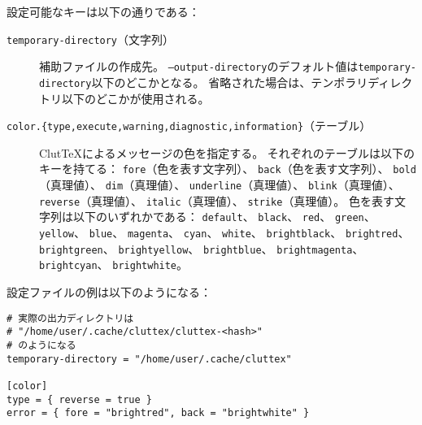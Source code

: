 \documentclass[a4paper]{ltjsreport}
\newcommand\ClutTeX{Clut\TeX}
\begin{document}
設定可能なキーは以下の通りである：
\begin{description}
\item[\texttt{temporary-directory}（文字列）]
  補助ファイルの作成先。
  \texttt{--output-directory}のデフォルト値は\texttt{temporary-directory}以下のどこかとなる。
  省略された場合は、テンポラリディレクトリ以下のどこかが使用される。
\item[\texttt{color.\{type,execute,warning,diagnostic,information\}}（テーブル）]
  \ClutTeX{}によるメッセージの色を指定する。
  それぞれのテーブルは以下のキーを持てる：
  \texttt{fore}（色を表す文字列）、
  \texttt{back}（色を表す文字列）、
  \texttt{bold}（真理値）、
  \texttt{dim}（真理値）、
  \texttt{underline}（真理値）、
  \texttt{blink}（真理値）、
  \texttt{reverse}（真理値）、
  \texttt{italic}（真理値）、
  \texttt{strike}（真理値）。
  色を表す文字列は以下のいずれかである：
  \texttt{default}、
  \texttt{black}、
  \texttt{red}、
  \texttt{green}、
  \texttt{yellow}、
  \texttt{blue}、
  \texttt{magenta}、
  \texttt{cyan}、
  \texttt{white}、
  \texttt{brightblack}、
  \texttt{brightred}、
  \texttt{brightgreen}、
  \texttt{brightyellow}、
  \texttt{brightblue}、
  \texttt{brightmagenta}、
  \texttt{brightcyan}、
  \texttt{brightwhite}。
\end{description}

設定ファイルの例は以下のようになる：
\begin{verbatim}
# 実際の出力ディレクトリは
# "/home/user/.cache/cluttex/cluttex-<hash>"
# のようになる
temporary-directory = "/home/user/.cache/cluttex"

[color]
type = { reverse = true }
error = { fore = "brightred", back = "brightwhite" }
\end{verbatim}
  
\end{document}
